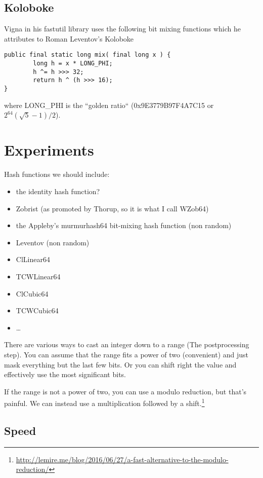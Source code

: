 \documentclass{article}
\begin{document}
\subsection{Koloboke}

Vigna in his fastutil library uses the following bit mixing functions which he attributes to  Roman Leventov's Koloboke


\begin{lstlisting}
public final static long mix( final long x ) {
		long h = x * LONG_PHI;
		h ^= h >>> 32;
		return h ^ (h >>> 16);
}
\end{lstlisting}

where LONG\_PHI is the ``golden ratio`` (0x9E3779B97F4A7C15 or $2^64 (\sqrt{5}-1)/2$).


\section{Experiments}



Hash functions we should include:
\begin{itemize}
\item the identity hash function? 
\item Zobrist (as promoted by Thorup, so it is what I call WZob64)
\item  the Appleby's murmurhash64 bit-mixing hash function (non random)
\item Leventov (non random)
\item ClLinear64
\item TCWLinear64
\item ClCubic64
\item TCWCubic64~\cite{Thorup:2004:TBH:982792.982884}
\item \ldots 
\end{itemize}



There are various ways to cast an integer down to a range (The postprocessing step). You can assume that the range fits a power of two (convenient) and just mask everything but the last few bits. Or you can shift right the value and effectively use the most significant bits.

If the range is not a power of two, you can use a modulo reduction, but that's painful.  We can instead use a multiplication followed by a shift.\footnote{\url{http://lemire.me/blog/2016/06/27/a-fast-alternative-to-the-modulo-reduction/}} 

\subsection{Speed}
\end{document}
